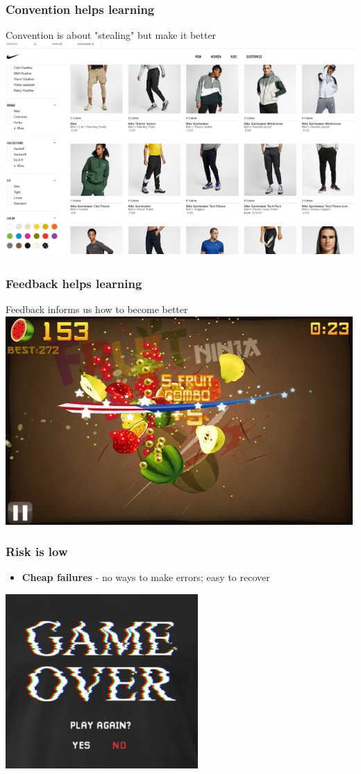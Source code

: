 \documentclass{beamer}
\begin{document}
\begin{frame}
	\frametitle{Convention helps learning}
	Convention is about "stealing" but make it better
	\centering
	\includegraphics[width=0.8\linewidth]{image/filter}
\end{frame}

\begin{frame}
	\frametitle{Feedback helps learning}
	Feedback informs us how to become better
	\centering
	\includegraphics[width=0.8\linewidth]{image/game2}
\end{frame}

\begin{frame}
	\frametitle{Risk is low}
	\begin{itemize}
		\item \textbf{Cheap failures} - no ways to make errors; easy to recover
	\end{itemize}
	\centering
	\includegraphics[width=0.5\linewidth]{image/playagain}
\end{frame}
\end{document}
